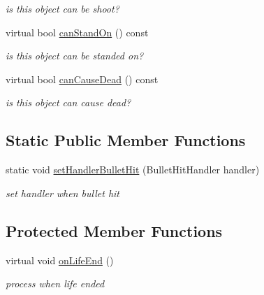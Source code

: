 \begin{DoxyCompactItemize}
\begin{DoxyCompactList}\small\item\em is this object can be shoot? \end{DoxyCompactList}\item 
virtual bool \hyperlink{class_n_c_t_u_1_1_bullet_obstacle_ac6d90f267ebd087d5322977344e69e59}{can\+Stand\+On} () const \hypertarget{class_n_c_t_u_1_1_bullet_obstacle_ac6d90f267ebd087d5322977344e69e59}{}\label{class_n_c_t_u_1_1_bullet_obstacle_ac6d90f267ebd087d5322977344e69e59}

\begin{DoxyCompactList}\small\item\em is this object can be standed on? \end{DoxyCompactList}\item 
virtual bool \hyperlink{class_n_c_t_u_1_1_bullet_obstacle_ae9fbd7f7ad7d5e58df1c5b28eaaf4bd5}{can\+Cause\+Dead} () const \hypertarget{class_n_c_t_u_1_1_bullet_obstacle_ae9fbd7f7ad7d5e58df1c5b28eaaf4bd5}{}\label{class_n_c_t_u_1_1_bullet_obstacle_ae9fbd7f7ad7d5e58df1c5b28eaaf4bd5}

\begin{DoxyCompactList}\small\item\em is this object can cause dead? \end{DoxyCompactList}\end{DoxyCompactItemize}
\subsection*{Static Public Member Functions}
\begin{DoxyCompactItemize}
\item 
static void \hyperlink{class_n_c_t_u_1_1_bullet_obstacle_a1b60b1c4c71033108c7f63e7722243bb}{set\+Handler\+Bullet\+Hit} (Bullet\+Hit\+Handler handler)\hypertarget{class_n_c_t_u_1_1_bullet_obstacle_a1b60b1c4c71033108c7f63e7722243bb}{}\label{class_n_c_t_u_1_1_bullet_obstacle_a1b60b1c4c71033108c7f63e7722243bb}

\begin{DoxyCompactList}\small\item\em set handler when bullet hit \end{DoxyCompactList}\end{DoxyCompactItemize}
\subsection*{Protected Member Functions}
\begin{DoxyCompactItemize}
\item 
virtual void \hyperlink{class_n_c_t_u_1_1_bullet_obstacle_a5b600a79973854cdc0dad76cbe8d77a6}{on\+Life\+End} ()\hypertarget{class_n_c_t_u_1_1_bullet_obstacle_a5b600a79973854cdc0dad76cbe8d77a6}{}\label{class_n_c_t_u_1_1_bullet_obstacle_a5b600a79973854cdc0dad76cbe8d77a6}

\begin{DoxyCompactList}\small\item\em process when life ended \end{DoxyCompactList}\end{DoxyCompactItemize}
